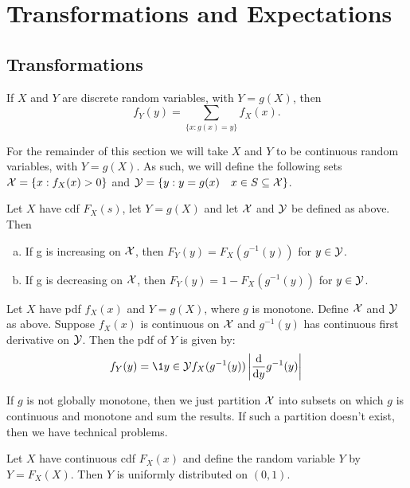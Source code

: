 \section{Transformations and Expectations}

\subsection{Transformations}

If $X$ and $Y$ are discrete random variables, with $Y = g(X)$, then
\begin{equation}
    f_Y(y) = \sum_{\{x: g(x) = y\}} f_X(x).
\end{equation}

For the remainder of this section we will take $X$ and $Y$ to be continuous random variables, with $Y = g(X)$. As such, we will define the following sets $\mathcal{X}{} = \{x: f_X(x) > 0\}$ and $\mathcal{Y}{} = \{y: y =g(x) \quad x \in S \subseteq \mathcal{X}{} \}$.\\

\begin{theorem}
    Let $X$ have cdf $F_X(s)$, let $Y = g(X)$ and let $\mathcal{X}{}$ and $\mathcal{Y}{}$ be defined as above. Then
    \begin{enumerate}[a.]
        \item If g is increasing on $\mathcal{X}{}$, then $F_Y(y) = F_X(g^{-1}(y))$ for $y \in \mathcal{Y}{}$.
        \item If g is decreasing on $\mathcal{X}{}$, then $F_Y(y) = 1 - F_X(g^{-1}(y))$ for $y \in \mathcal{Y}{}$. 
    \end{enumerate}
\end{theorem}

\begin{theorem}
    Let $X$ have pdf $f_X(x)$ and $Y = g(X)$, where $g$ is monotone. Define $\mathcal{X}{}$ and $\mathcal{Y}{}$ as above. Suppose $f_X(x)$ is continuous on $\mathcal{X}{}$ and $g^{-1}(y)$ has continuous first derivative on $\mathcal{Y}{}$. Then the pdf of $Y$ is given by:
    \begin{equation*}
        f_Y(y) = \1{y \in \Y{}} f_X(g^{-1}(y)) \abs{ \frac{\d{}}{\d{}y} g^{-1}(y) }
    \end{equation*}
\end{theorem}

If $g$ is not globally monotone, then we just partition $\mathcal{X}{}$ into subsets on which $g$ is continuous and monotone and sum the results. If such a partition doesn't exist, then we have technical problems.\\

\begin{theorem}
    Let $X$ have continuous cdf $F_X(x)$ and define the random variable $Y$ by $Y = F_X(X)$. Then $Y$ is uniformly distributed on $(0, 1)$.
\end{theorem}

